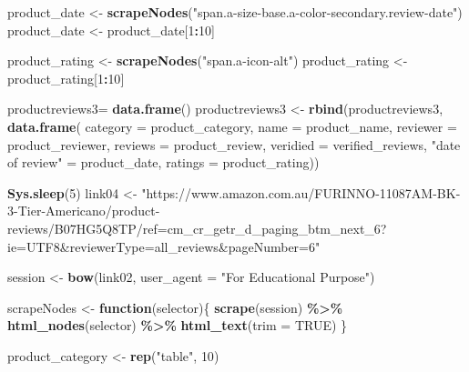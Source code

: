\documentclass[
]{article}
\newenvironment{Shaded}{\begin{snugshade}}{\end{snugshade}}
\newcommand{\AttributeTok}[1]{\textcolor[rgb]{0.13,0.29,0.53}{#1}}
\newcommand{\ConstantTok}[1]{\textcolor[rgb]{0.56,0.35,0.01}{#1}}
\newcommand{\ControlFlowTok}[1]{\textcolor[rgb]{0.13,0.29,0.53}{\textbf{#1}}}
\newcommand{\DecValTok}[1]{\textcolor[rgb]{0.00,0.00,0.81}{#1}}
\newcommand{\FunctionTok}[1]{\textcolor[rgb]{0.13,0.29,0.53}{\textbf{#1}}}
\newcommand{\NormalTok}[1]{#1}
\newcommand{\OtherTok}[1]{\textcolor[rgb]{0.56,0.35,0.01}{#1}}
\newcommand{\SpecialCharTok}[1]{\textcolor[rgb]{0.81,0.36,0.00}{\textbf{#1}}}
\newcommand{\StringTok}[1]{\textcolor[rgb]{0.31,0.60,0.02}{#1}}
\begin{document}
\begin{Shaded}
\begin{Highlighting}[]
\NormalTok{  product\_date }\OtherTok{\textless{}{-}} \FunctionTok{scrapeNodes}\NormalTok{(}\StringTok{"span.a{-}size{-}base.a{-}color{-}secondary.review{-}date"}\NormalTok{)}
\NormalTok{  product\_date }\OtherTok{\textless{}{-}}\NormalTok{ product\_date[}\DecValTok{1}\SpecialCharTok{:}\DecValTok{10}\NormalTok{]}
  
\NormalTok{  product\_rating }\OtherTok{\textless{}{-}} \FunctionTok{scrapeNodes}\NormalTok{(}\StringTok{"span.a{-}icon{-}alt"}\NormalTok{)}
\NormalTok{  product\_rating }\OtherTok{\textless{}{-}}\NormalTok{ product\_rating[}\DecValTok{1}\SpecialCharTok{:}\DecValTok{10}\NormalTok{]}
  
\NormalTok{  productreviews3}\OtherTok{=} \FunctionTok{data.frame}\NormalTok{()}
\NormalTok{  productreviews3 }\OtherTok{\textless{}{-}} \FunctionTok{rbind}\NormalTok{(productreviews3, }\FunctionTok{data.frame}\NormalTok{(}
                      \AttributeTok{category =}\NormalTok{ product\_category,}
                      \AttributeTok{name =}\NormalTok{ product\_name,}
                      \AttributeTok{reviewer =}\NormalTok{ product\_reviewer,}
                      \AttributeTok{reviews =}\NormalTok{ product\_review,}
                      \AttributeTok{veridied =}\NormalTok{ verified\_reviews,}
                      \StringTok{"date of review"} \OtherTok{=}\NormalTok{ product\_date,}
                      \AttributeTok{ratings =}\NormalTok{ product\_rating))}
  
   \FunctionTok{Sys.sleep}\NormalTok{(}\DecValTok{5}\NormalTok{)}
\NormalTok{link04 }\OtherTok{\textless{}{-}} \StringTok{"https://www.amazon.com.au/FURINNO{-}11087AM{-}BK{-}3{-}Tier{-}Americano/product{-}reviews/B07HG5Q8TP/ref=cm\_cr\_getr\_d\_paging\_btm\_next\_6?ie=UTF8\&reviewerType=all\_reviews\&pageNumber=6"}


\NormalTok{  session }\OtherTok{\textless{}{-}} \FunctionTok{bow}\NormalTok{(link02,}
               \AttributeTok{user\_agent =} \StringTok{"For Educational Purpose"}\NormalTok{)}

\NormalTok{  scrapeNodes }\OtherTok{\textless{}{-}} \ControlFlowTok{function}\NormalTok{(selector)\{}
    \FunctionTok{scrape}\NormalTok{(session) }\SpecialCharTok{\%\textgreater{}\%}
      \FunctionTok{html\_nodes}\NormalTok{(selector) }\SpecialCharTok{\%\textgreater{}\%}
      \FunctionTok{html\_text}\NormalTok{(}\AttributeTok{trim =} \ConstantTok{TRUE}\NormalTok{)}
\NormalTok{  \}}

\NormalTok{  product\_category }\OtherTok{\textless{}{-}} \FunctionTok{rep}\NormalTok{(}\StringTok{"table"}\NormalTok{, }\DecValTok{10}\NormalTok{)}


\end{Highlighting}
\end{Shaded}
\end{document}
